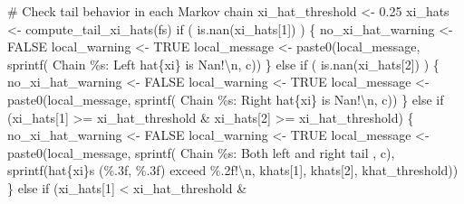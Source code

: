 \documentclass[
  letterpaper,
  DIV=11,
  numbers=noendperiod]{scrartcl}
\newenvironment{Shaded}{\begin{snugshade}}{\end{snugshade}}
\newcommand{\CommentTok}[1]{\textcolor[rgb]{0.37,0.37,0.37}{#1}}
\newcommand{\ConstantTok}[1]{\textcolor[rgb]{0.56,0.35,0.01}{#1}}
\newcommand{\ControlFlowTok}[1]{\textcolor[rgb]{0.00,0.23,0.31}{#1}}
\newcommand{\DecValTok}[1]{\textcolor[rgb]{0.68,0.00,0.00}{#1}}
\newcommand{\FloatTok}[1]{\textcolor[rgb]{0.68,0.00,0.00}{#1}}
\newcommand{\FunctionTok}[1]{\textcolor[rgb]{0.28,0.35,0.67}{#1}}
\newcommand{\NormalTok}[1]{\textcolor[rgb]{0.00,0.23,0.31}{#1}}
\newcommand{\OtherTok}[1]{\textcolor[rgb]{0.00,0.23,0.31}{#1}}
\newcommand{\SpecialCharTok}[1]{\textcolor[rgb]{0.37,0.37,0.37}{#1}}
\newcommand{\StringTok}[1]{\textcolor[rgb]{0.13,0.47,0.30}{#1}}
\begin{document}
\begin{Shaded}
\begin{Highlighting}[]
      \CommentTok{\# Check tail behavior in each Markov chain}
\NormalTok{      xi\_hat\_threshold }\OtherTok{\textless{}{-}} \FloatTok{0.25}
\NormalTok{      xi\_hats }\OtherTok{\textless{}{-}} \FunctionTok{compute\_tail\_xi\_hats}\NormalTok{(fs)}
      \ControlFlowTok{if}\NormalTok{ ( }\FunctionTok{is.nan}\NormalTok{(xi\_hats[}\DecValTok{1}\NormalTok{]) ) \{}
\NormalTok{        no\_xi\_hat\_warning }\OtherTok{\textless{}{-}} \ConstantTok{FALSE}
\NormalTok{        local\_warning }\OtherTok{\textless{}{-}} \ConstantTok{TRUE}
\NormalTok{        local\_message }\OtherTok{\textless{}{-}}
          \FunctionTok{paste0}\NormalTok{(local\_message,}
                 \FunctionTok{sprintf}\NormalTok{(}\StringTok{\textquotesingle{}  Chain \%s: Left hat\{xi\} is Nan!}\SpecialCharTok{\textbackslash{}n}\StringTok{\textquotesingle{}}\NormalTok{, c))}
\NormalTok{      \} }\ControlFlowTok{else} \ControlFlowTok{if}\NormalTok{ ( }\FunctionTok{is.nan}\NormalTok{(xi\_hats[}\DecValTok{2}\NormalTok{]) ) \{}
\NormalTok{        no\_xi\_hat\_warning }\OtherTok{\textless{}{-}} \ConstantTok{FALSE}
\NormalTok{        local\_warning }\OtherTok{\textless{}{-}} \ConstantTok{TRUE}
\NormalTok{        local\_message }\OtherTok{\textless{}{-}}
          \FunctionTok{paste0}\NormalTok{(local\_message,}
                 \FunctionTok{sprintf}\NormalTok{(}\StringTok{\textquotesingle{}  Chain \%s: Right hat\{xi\} is Nan!}\SpecialCharTok{\textbackslash{}n}\StringTok{\textquotesingle{}}\NormalTok{, c))}
\NormalTok{      \} }\ControlFlowTok{else} \ControlFlowTok{if}\NormalTok{ (xi\_hats[}\DecValTok{1}\NormalTok{] }\SpecialCharTok{\textgreater{}=}\NormalTok{ xi\_hat\_threshold }\SpecialCharTok{\&} 
\NormalTok{          xi\_hats[}\DecValTok{2}\NormalTok{] }\SpecialCharTok{\textgreater{}=}\NormalTok{ xi\_hat\_threshold) \{}
\NormalTok{        no\_xi\_hat\_warning }\OtherTok{\textless{}{-}} \ConstantTok{FALSE}
\NormalTok{        local\_warning }\OtherTok{\textless{}{-}} \ConstantTok{TRUE}
\NormalTok{        local\_message }\OtherTok{\textless{}{-}}
          \FunctionTok{paste0}\NormalTok{(local\_message,}
                \FunctionTok{sprintf}\NormalTok{(}\StringTok{\textquotesingle{}  Chain \%s: Both left and right tail \textquotesingle{}}\NormalTok{, c),}
                \FunctionTok{sprintf}\NormalTok{(}\StringTok{\textquotesingle{}hat\{xi\}s (\%.3f, \%.3f) exceed \%.2f!}\SpecialCharTok{\textbackslash{}n}\StringTok{\textquotesingle{}}\NormalTok{, }
\NormalTok{                        khats[}\DecValTok{1}\NormalTok{], khats[}\DecValTok{2}\NormalTok{], khat\_threshold))}
\NormalTok{      \} }\ControlFlowTok{else} \ControlFlowTok{if}\NormalTok{ (xi\_hats[}\DecValTok{1}\NormalTok{] }\SpecialCharTok{\textless{}}\NormalTok{ xi\_hat\_threshold }\SpecialCharTok{\&} 

\end{Highlighting}
\end{Shaded}
\end{document}
